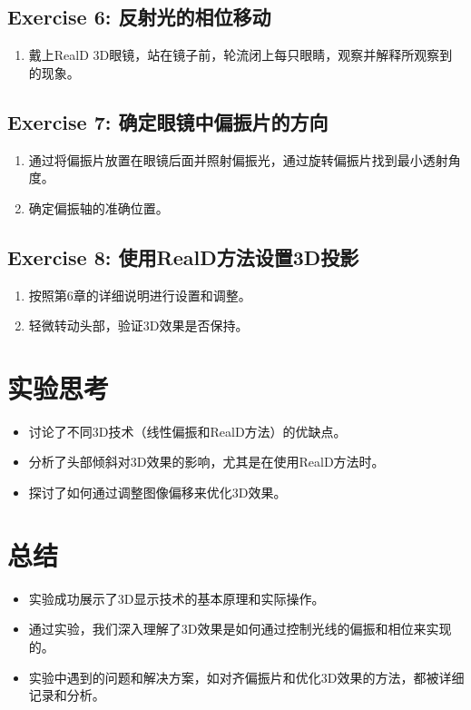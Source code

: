 \documentclass{ctexart}
\begin{document}
\subsection{Exercise 6: 反射光的相位移动}
\begin{enumerate}
    \item 戴上RealD 3D眼镜，站在镜子前，轮流闭上每只眼睛，观察并解释所观察到的现象。
\end{enumerate}

\subsection{Exercise 7: 确定眼镜中偏振片的方向}
\begin{enumerate}
    \item 通过将偏振片放置在眼镜后面并照射偏振光，通过旋转偏振片找到最小透射角度。
    \item 确定偏振轴的准确位置。
\end{enumerate}

\subsection{Exercise 8: 使用RealD方法设置3D投影}
\begin{enumerate}
    \item 按照第6章的详细说明进行设置和调整。
    \item 轻微转动头部，验证3D效果是否保持。
\end{enumerate}

\section{实验思考}
\begin{itemize}
    \item 讨论了不同3D技术（线性偏振和RealD方法）的优缺点。
    \item 分析了头部倾斜对3D效果的影响，尤其是在使用RealD方法时。
    \item 探讨了如何通过调整图像偏移来优化3D效果。
\end{itemize}

\section{总结}
\begin{itemize}
    \item 实验成功展示了3D显示技术的基本原理和实际操作。
    \item 通过实验，我们深入理解了3D效果是如何通过控制光线的偏振和相位来实现的。
    \item 实验中遇到的问题和解决方案，如对齐偏振片和优化3D效果的方法，都被详细记录和分析。
\end{itemize}
\end{document}
